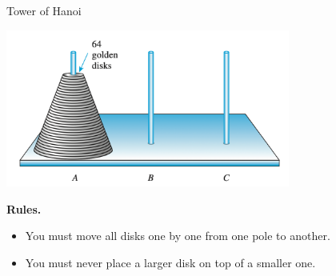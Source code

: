 \documentclass[10pt]{beamer}
\begin{document}
\begin{frame}{Tower of Hanoi}


   \begin{center}
 \includegraphics[width=0.7\textwidth]{images/tower_of_hanoi}
   \end{center}

\vfill 
\colorbox{red!30}{\textbf{Rules.}} 
\begin{itemize}
\item You must move all disks one by one from one pole to another.
\item You must never place a larger disk on top of a smaller one.	
\end{itemize}

\end{frame}
	
\end{document}
